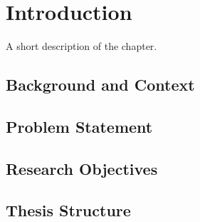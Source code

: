 \chapter{Introduction}%
\label{chapter:introduction}

\begin{introduction}
A short description of the chapter.
\end{introduction}

\section{Background and Context}


\section{Problem Statement}


\section{Research Objectives}

\section{Thesis Structure}
